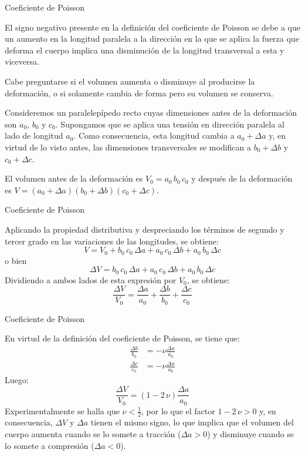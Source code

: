 \documentclass[11pt,handout,aspectratio=1610]{beamer}
\newcommand{\vs}{\vspace{11pt}}
\begin{document}
\begin{frame}{Coeficiente de Poisson}

    El signo negativo presente en la definición del coeficiente de Poisson se debe a que un aumento en la longitud paralela a la dirección en la que se aplica la fuerza que deforma el cuerpo implica una disminución de la longitud transversal a esta y viceversa.

    \vs

    Cabe preguntarse si el volumen aumenta o disminuye al producirse la deformación, o si solamente cambia de forma pero su volumen se conserva.

    \vs 

    Consideremos un paralelepípedo recto cuyas dimensiones antes de la deformación son $a_0$, $b_0$ y $c_0$. Supongamos que se aplica una tensión en dirección paralela al lado de longitud $a_0$. Como consecuencia, esta longitud cambia a $a_0 + \Delta a$ y, en virtud de lo visto antes, las dimensiones transversales se modifican a $b_0 + \Delta b$ y $c_0 + \Delta c$.

    \vs 

    El volumen antes de la deformación es $V_0 = a_0 \, b_0 \, c_0$ y después de la deformación es $V = \left(a_0 + \Delta a\right) \left(b_0 + \Delta b\right) \left(c_0 + \Delta c\right)$.

    
\end{frame}

\begin{frame}{Coeficiente de Poisson}

    Aplicando la propiedad distributiva y despreciando los términos de segundo y tercer grado en las variaciones de las longitudes, se obtiene: $$ V = V_0 + b_0 \, c_0 \, \Delta a + a_0 \, c_0 \, \Delta b + a_0 \, b_0 \, \Delta c $$ o bien $$ \Delta V = b_0 \, c_0 \, \Delta a + a_0 \, c_0 \, \Delta b + a_0 \, b_0 \, \Delta c $$ Dividiendo a ambos lados de esta expresión por $V_0$, se obtiene: $$ \frac{\Delta V}{V_0} = \frac{\Delta a}{a_0} + \frac{\Delta b}{b_0} + \frac{\Delta c}{c_0} $$

        
\end{frame}

\begin{frame}{Coeficiente de Poisson}

    En virtud de la definición del coeficiente de Poisson, se tiene que:
    \begin{align}
        \frac{\Delta b}{b_0} &= - \nu \frac{\Delta a}{a_0} \\
        \frac{\Delta c}{c_0} &= - \nu \frac{\Delta a}{a_0} 
    \end{align} Luego: $$ \frac{\Delta V}{V_0} = \left(1 - 2 \, \nu\right) \frac{\Delta a}{a_0} $$ Experimentalmente se halla que $\nu < \frac{1}{2}$, por lo que el factor $ 1 - 2 \, \nu > 0$ y, en consecuencia, $\Delta V$ y $\Delta a$ tienen el mismo signo, lo que implica que el volumen del cuerpo aumenta cuando se lo somete a tracción ($\Delta a > 0$) y disminuye cuando se lo somete a compresión ($\Delta a < 0$).

\end{frame}
\end{document}
